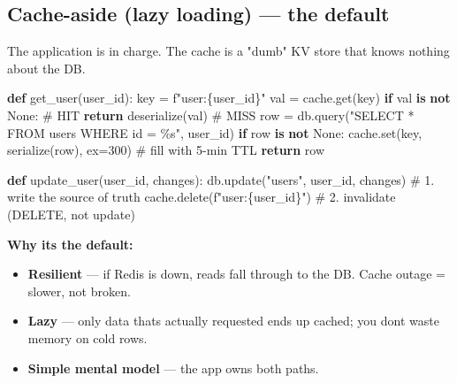 \documentclass[11pt]{article}
\providecommand{\tightlist}{\setlength{\itemsep}{1pt}\setlength{\parskip}{0pt}}
\newenvironment{Shaded}{\begin{snugshade}}{\end{snugshade}}
\newcommand{\BuiltInTok}[1]{\textcolor[rgb]{0.50,0.55,0.55}{#1}}
\newcommand{\CommentTok}[1]{\textcolor[rgb]{0.48,0.49,0.49}{#1}}
\newcommand{\ControlFlowTok}[1]{\textcolor[rgb]{0.99,0.74,0.29}{\textbf{#1}}}
\newcommand{\DecValTok}[1]{\textcolor[rgb]{0.96,0.45,0.00}{#1}}
\newcommand{\KeywordTok}[1]{\textcolor[rgb]{0.81,0.81,0.76}{\textbf{#1}}}
\newcommand{\NormalTok}[1]{\textcolor[rgb]{0.81,0.81,0.76}{#1}}
\newcommand{\OperatorTok}[1]{\textcolor[rgb]{0.81,0.81,0.76}{#1}}
\newcommand{\SpecialCharTok}[1]{\textcolor[rgb]{0.24,0.68,0.91}{#1}}
\newcommand{\SpecialStringTok}[1]{\textcolor[rgb]{0.85,0.27,0.33}{#1}}
\newcommand{\StringTok}[1]{\textcolor[rgb]{0.96,0.31,0.31}{#1}}
\newcommand{\VariableTok}[1]{\textcolor[rgb]{0.15,0.68,0.68}{#1}}
\begin{document}
\subsection{Cache-aside (lazy loading) --- the default}\label{cache-aside-lazy-loading--the-default}

The application is in charge. The cache is a "dumb" KV store that knows nothing about the DB.


\begin{Shaded}
\begin{Highlighting}[]
\KeywordTok{def}\NormalTok{ get\_user(user\_id):}
\NormalTok{    key }\OperatorTok{=} \SpecialStringTok{f"user:}\SpecialCharTok{\{}\NormalTok{user\_id}\SpecialCharTok{\}}\SpecialStringTok{"}
\NormalTok{    val }\OperatorTok{=}\NormalTok{ cache.get(key)}
    \ControlFlowTok{if}\NormalTok{ val }\KeywordTok{is} \KeywordTok{not} \VariableTok{None}\NormalTok{:           }\CommentTok{\# HIT}
        \ControlFlowTok{return}\NormalTok{ deserialize(val)}
    \CommentTok{\# MISS}
\NormalTok{    row }\OperatorTok{=}\NormalTok{ db.query(}\StringTok{"SELECT * FROM users WHERE id = }\SpecialCharTok{\%s}\StringTok{"}\NormalTok{, user\_id)}
    \ControlFlowTok{if}\NormalTok{ row }\KeywordTok{is} \KeywordTok{not} \VariableTok{None}\NormalTok{:}
\NormalTok{        cache.}\BuiltInTok{set}\NormalTok{(key, serialize(row), ex}\OperatorTok{=}\DecValTok{300}\NormalTok{)   }\CommentTok{\# fill with 5{-}min TTL}
    \ControlFlowTok{return}\NormalTok{ row}

\KeywordTok{def}\NormalTok{ update\_user(user\_id, changes):}
\NormalTok{    db.update(}\StringTok{"users"}\NormalTok{, user\_id, changes)   }\CommentTok{\# 1. write the source of truth}
\NormalTok{    cache.delete(}\SpecialStringTok{f"user:}\SpecialCharTok{\{}\NormalTok{user\_id}\SpecialCharTok{\}}\SpecialStringTok{"}\NormalTok{)        }\CommentTok{\# 2. invalidate (DELETE, not update)}
\end{Highlighting}
\end{Shaded}

\textbf{Why it\textquotesingle s the default:}

\begin{itemize}
\tightlist
\item
  \textbf{Resilient} --- if Redis is down, reads fall through to the DB. Cache outage = slower, not broken.
\item
  \textbf{Lazy} --- only data that\textquotesingle s actually requested ends up cached; you don\textquotesingle t waste memory on cold rows.
\item
  \textbf{Simple mental model} --- the app owns both paths.
\end{itemize}
\end{document}
